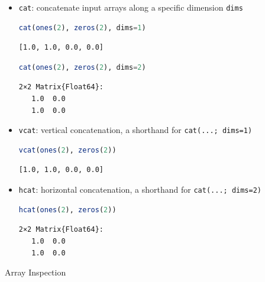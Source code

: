 \documentclass[
  notoc %
]{tufte-book}
\makeatletter
\newcommand{\passthrough}[1]{#1}
\renewcommand\subsubsection{%
\@startsection{subsubsection}{3}{\z@ }{-3.25ex\@plus -1ex \@minus -.2ex}{1.5ex \@plus .2ex}{\normalfont \normalsize \bfseries }
}
\makeatother
\begin{document}
\begin{itemize}
\item
  \passthrough{\lstinline!cat!}: concatenate input arrays along a
  specific dimension \passthrough{\lstinline!dims!}

  \begin{lstlisting}[language=Julia]
  cat(ones(2), zeros(2), dims=1)
  \end{lstlisting}

  \begin{lstlisting}[language=Output]
  [1.0, 1.0, 0.0, 0.0]
  \end{lstlisting}

  \begin{lstlisting}[language=Julia]
  cat(ones(2), zeros(2), dims=2)
  \end{lstlisting}

  \begin{lstlisting}[language=Output]
  2×2 Matrix{Float64}:
   1.0  0.0
   1.0  0.0
  \end{lstlisting}
\item
  \passthrough{\lstinline!vcat!}: vertical concatenation, a shorthand
  for \passthrough{\lstinline!cat(...; dims=1)!}

  \begin{lstlisting}[language=Julia]
  vcat(ones(2), zeros(2))
  \end{lstlisting}

  \begin{lstlisting}[language=Output]
  [1.0, 1.0, 0.0, 0.0]
  \end{lstlisting}
\item
  \passthrough{\lstinline!hcat!}: horizontal concatenation, a shorthand
  for \passthrough{\lstinline!cat(...; dims=2)!}

  \begin{lstlisting}[language=Julia]
  hcat(ones(2), zeros(2))
  \end{lstlisting}

  \begin{lstlisting}[language=Output]
  2×2 Matrix{Float64}:
   1.0  0.0
   1.0  0.0
  \end{lstlisting}
\end{itemize}

\hypertarget{sec:array_inspection}{%
\subsubsection{Array Inspection}\label{sec:array_inspection}}
\end{document}
